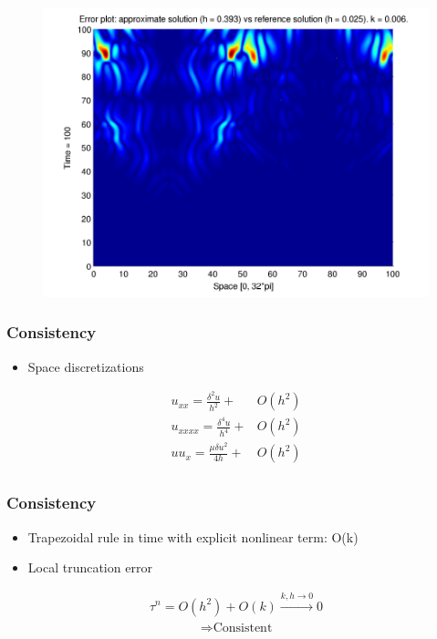 \documentclass[screen]{beamer}
\begin{document}
\begin{frame}

\begin{figure}[htb]
\includegraphics[width=1\textwidth]{error_num_ref_t100_2nd.pdf}
\end{figure}

\end{frame}


\begin{frame}
\frametitle{Consistency}
\begin{itemize}

\item Space discretizations
\end{itemize}
\begin{align*}
u_{xx} = \frac{\delta^2 u}{h^2} + &O(h^2) \\
u_{xxxx} = \frac{\delta^4 u}{h^4} + &O(h^2) \\
uu_{x} = \frac{\mu \delta u^2}{4h} + &O(h^2) \\
\end{align*}

\end{frame}

\begin{frame}

\frametitle{Consistency}
\begin{itemize}
\item Trapezoidal rule in time with explicit nonlinear term:  O(k)
\item Local truncation error
\end{itemize}

\begin{align*}
\tau ^n = O(h^2) + O(k) \xrightarrow{k,h \to 0} 0
\end{align*}
\begin{align*}
\Rightarrow \textrm{Consistent}
\end{align*}

\end{frame}
\end{document}
